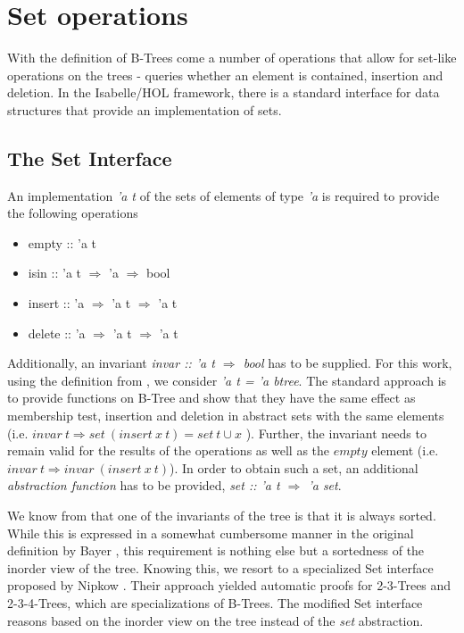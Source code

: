 \section{Set operations}

With the definition of B-Trees come a number of operations that allow
for set-like operations on the trees -
queries whether an element is contained, insertion and deletion.
In the Isabelle/HOL framework, there is a standard interface
for data structures that provide an implementation of sets.

\subsection{The Set Interface}

An implementation \textit{'a t} of the sets of elements of type \textit{'a} is required to provide the following
operations

\begin{itemize}
    \itshape
    \item empty :: 'a t
    \item isin :: 'a t $\Rightarrow$ 'a $\Rightarrow$ bool
    \item insert :: 'a $\Rightarrow$ 'a t $\Rightarrow$ 'a t
    \item delete :: 'a $\Rightarrow$ 'a t $\Rightarrow$ 'a t
\end{itemize}

Additionally, an invariant \textit{invar :: 'a t $\Rightarrow$ bool} has to be supplied.
For this work, using the definition from ,
we consider \textit{'a t = 'a btree}.
The standard approach is to provide functions on B-Tree and show
that they have the same effect as membership test, insertion and deletion 
in abstract sets with the same elements
(i.e. $invar\ t \Longrightarrow set\ (insert\ x\ t) = set\ t \cup {x}$ ).
Further, the invariant needs to remain valid for the results of the operations
as well as the $empty$ element (i.e. $invar\ t \Longrightarrow invar\ (insert\ x\ t)$).
In order to obtain such a set, an additional \textit{abstraction function}
has to be provided, \textit{set :: 'a t $\Rightarrow$ 'a set}.

We know from  that one of the invariants
of the tree is that it is always sorted.
While this is expressed in a somewhat cumbersome manner
in the original definition by Bayer \parencite{DBLP:journals/acta/BayerM72},
this requirement is nothing else but a sortedness of the inorder view of the tree.
Knowing this, we resort to a specialized Set interface
proposed by Nipkow \parencite{DBLP:conf/itp/Nipkow16}.
Their approach yielded automatic proofs for 2-3-Trees
and 2-3-4-Trees, which are specializations of B-Trees.
The modified Set interface reasons based on the inorder
view on the tree instead of the \textit{set} abstraction.

